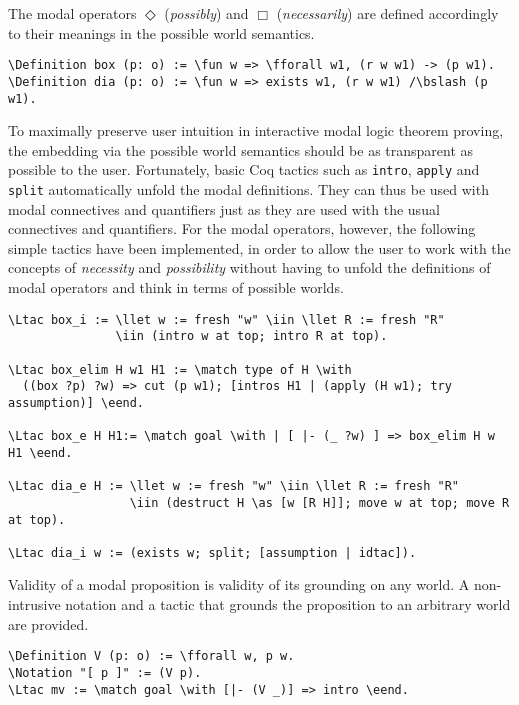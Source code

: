 \documentclass{llncs}
\newcommand{\red}[1]{\textcolor[rgb]{1,0,0}{#1}}
\newcommand{\blue}[1]{\textcolor[rgb]{0,0,1}{#1}}
\newcommand{\Ltac}{\red{Ltac}}
\newcommand{\Definition}{\red{Definition}}
\newcommand{\Notation}{\blue{Notation}}
\newcommand{\llet}{\blue{let}}
\newcommand{\match}{\blue{match}}
\newcommand{\with}{\blue{with}}
\newcommand{\eend}{\blue{end}}
\newcommand{\iin}{\blue{in}}
\newcommand{\as}{\blue{as}}
\newcommand{\fforall}{\blue{forall}}
\newcommand{\fun}{\blue{fun}}
\newcommand{\bslash}{\symbol{92}}
\begin{document}
\noindent
The modal operators $\Diamond$ (\emph{possibly}) and $\Box$ (\emph{necessarily}) are defined accordingly to their meanings in the possible world semantics.

\begin{Verbatim}[commandchars=\\\{\},fontsize=\verbsize]
\Definition box (p: o) := \fun w => \fforall w1, (r w w1) -> (p w1).
\Definition dia (p: o) := \fun w => exists w1, (r w w1) /\bslash (p w1).
\end{Verbatim}

\noindent
To maximally preserve user intuition in interactive modal logic theorem
proving, the embedding via the possible world semantics should be as
transparent as possible to the user. Fortunately, basic Coq tactics
such as \texttt{intro}, \texttt{apply} and \texttt{split} automatically
unfold the modal definitions. They can thus be used with modal
connectives and quantifiers just as they are used with the usual
connectives and quantifiers.  For the modal operators, however, the
following simple tactics have been implemented, in order to allow the
user to work with the concepts of \emph{necessity} and
\emph{possibility} without having to unfold the definitions of modal
operators and think in terms of possible worlds.

\begin{Verbatim}[commandchars=\\\{\},fontsize=\verbsize]
\Ltac box_i := \llet w := fresh "w" \iin \llet R := fresh "R" 
               \iin (intro w at top; intro R at top).

\Ltac box_elim H w1 H1 := \match type of H \with 
  ((box ?p) ?w) => cut (p w1); [intros H1 | (apply (H w1); try assumption)] \eend.

\Ltac box_e H H1:= \match goal \with | [ |- (_ ?w) ] => box_elim H w H1 \eend.

\Ltac dia_e H := \llet w := fresh "w" \iin \llet R := fresh "R" 
                 \iin (destruct H \as [w [R H]]; move w at top; move R at top).

\Ltac dia_i w := (exists w; split; [assumption | idtac]).
\end{Verbatim}

\noindent
Validity of a modal proposition is validity of its grounding on any world. A non-intrusive notation and a tactic that grounds the proposition to an arbitrary world are provided.

\begin{Verbatim}[commandchars=\\\{\},fontsize=\verbsize]
\Definition V (p: o) := \fforall w, p w.
\Notation "[ p ]" := (V p).
\Ltac mv := \match goal \with [|- (V _)] => intro \eend.
\end{Verbatim}
\end{document}
